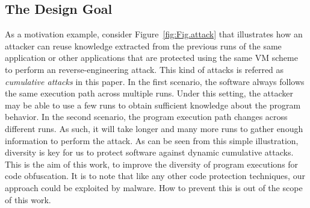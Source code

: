 \subsection{The Design Goal}
As a motivation example, consider Figure~\ref{fig:Fig.attack} that illustrates how an attacker
can reuse knowledge extracted from the previous runs of the same application or
other applications that are protected using the same VM scheme to perform an reverse-engineering attack.
This kind of attacks is referred as \emph{cumulative attacks} in this paper.
In the first scenario, the software always follows the same execution path
across multiple runs. Under this setting, the attacker may be able to use a few runs to
obtain sufficient knowledge about the program behavior.
In the second scenario, the program execution path changes across different runs.
As such, it will take longer and many more runs to gather enough information to perform the attack.
As can be seen from this simple illustration, diversity is key for us to protect software against dynamic cumulative attacks.
This is the aim of this work, to improve the diversity of program executions for code obfuscation.
It is to note that like any other code protection techniques, our approach could be exploited by malware.
How to prevent this is out of the scope of this work.
